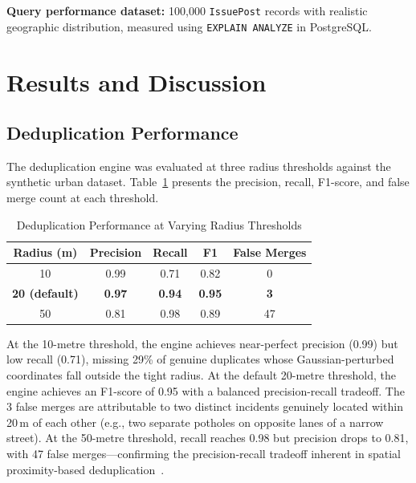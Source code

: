 \documentclass[conference]{IEEEtran}
\begin{document}
\textbf{Query performance dataset:} 100{,}000 \texttt{IssuePost} records with realistic geographic distribution, measured using \texttt{EXPLAIN ANALYZE} in PostgreSQL.

\section{Results and Discussion}

\subsection{Deduplication Performance}

The deduplication engine was evaluated at three radius thresholds against the synthetic urban dataset. Table~\ref{tab:dedup} presents the precision, recall, F1-score, and false merge count at each threshold.

\begin{table}[htbp]
\caption{Deduplication Performance at Varying Radius Thresholds}
\begin{center}
\begin{tabular}{ccccc}
\toprule
\textbf{Radius (m)} & \textbf{Precision} & \textbf{Recall} & \textbf{F1} & \textbf{False Merges} \\
\midrule
10 & 0.99 & 0.71 & 0.82 & 0 \\
\textbf{20 (default)} & \textbf{0.97} & \textbf{0.94} & \textbf{0.95} & \textbf{3} \\
50 & 0.81 & 0.98 & 0.89 & 47 \\
\bottomrule
\end{tabular}
\label{tab:dedup}
\end{center}
\end{table}

At the 10-metre threshold, the engine achieves near-perfect precision (0.99) but low recall (0.71), missing 29\% of genuine duplicates whose Gaussian-perturbed coordinates fall outside the tight radius. At the default 20-metre threshold, the engine achieves an F1-score of 0.95 with a balanced precision-recall tradeoff. The 3 false merges are attributable to two distinct incidents genuinely located within 20\,m of each other (e.g., two separate potholes on opposite lanes of a narrow street). At the 50-metre threshold, recall reaches 0.98 but precision drops to 0.81, with 47 false merges---confirming the precision-recall tradeoff inherent in spatial proximity-based deduplication~\cite{b5}.
\end{document}
